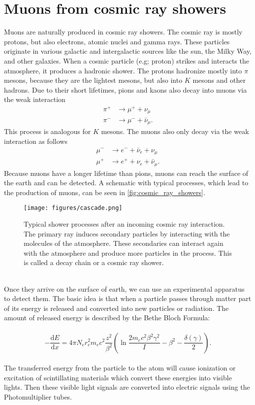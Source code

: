 \section{Muons from cosmic ray showers} 
Muons are naturally produced in cosmic ray showers.
The cosmic ray is mostly protons, but also electrons, atomic nuclei and gamma rays.
These particles originate in various galactic and intergalactic sources like the sun, the Milky Way, and other galaxies.
When a cosmic particle (e.g; proton) strikes and interacts the atmosphere, it produces a hadronic shower.
The protons hadronize mostly into $\pi$ mesons, because they are the lightest mesons, but also into $K$ mesons and other hadrons.
Due to their short lifetimes, pions and kaons also decay into muons via the weak interaction 
\begin{align*}
    \pi^{+} &\to \mu^{+} + \nu_{\mu} \\
    \pi^{-} &\to \mu^{-} + \bar{\nu}_{\mu}.
\end{align*}
This process is analogous for $K$ mesons.
The muons also only decay via the weak interaction as follows 
\begin{align*}
    \mu^{-} &\to e^{-} + \bar{\nu}_{e} + {\nu}_{\mu} \\
    \mu^{+} &\to e^{+} + \nu_{e} + \bar{\nu}_{\mu}.
\end{align*}
Because muons have a longer lifetime than pions, muons can reach the surface of the earth and 
can be detected. 
A schematic with typical processes, which lead to the production of muons, can be seen in \autoref{fig:cosmic_ray_showers}.
\begin{figure}
    \centering
    \texttt{[image: figures/cascade.png]}
    \caption{Typical shower processes after an incoming cosmic ray interaction. The primary ray induces secondary particles by interacting with the 
    molecules of the atmosphere. These secondaries can interact again with the atmosphere and produce more particles in the process. 
    This is called a decay chain or a cosmic ray shower\cite{nasa}.}
    \label{fig:cosmic_ray_showers}
\end{figure}
\\
Once they arrive on the surface of earth, we can use an experimental apparatus to detect them.
The basic idea is that when a particle passes through matter part of its energy is released 
and converted into new particles or radiation.
The amount of released energy is described by the Bethe Bloch Formula:\\\\
\begin{equation*}
    -\frac{\mathrm dE}{\mathrm dx} = 4 \pi N_e r^2_e m_e c^2 \frac{z^2}{\beta^2}\left(\ln{\frac{2m_e c^2\beta^2 \gamma^2}{I}-\beta^2-\frac{\delta(\gamma)}{2}}\right).
\end{equation*}
\\
The transferred energy from the particle to the atom will cause ionization or excitation 
of scintillating materials which convert these energies into visible lights. Then these 
visible light signals are converted into electric signals using the Photomultiplier tubes.
